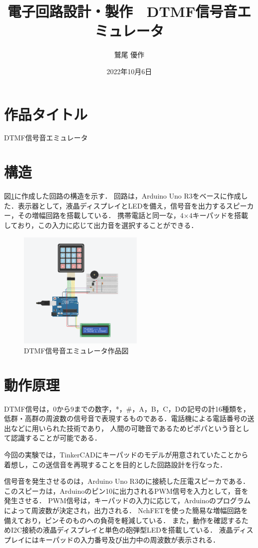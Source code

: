 \documentclass[dvipdfmx,titlepage,a4j]{jsarticle}  %
\title{電子回路設計・製作　DTMF信号音エミュレータ}
\author{鷲尾 優作}
\date{2022年10月6日}
\begin{document}
\pagestyle{foot}

\maketitle

\section{作品タイトル}
DTMF信号音エミュレータ
\section{構造}
図\ref{fig:dia.png}に作成した回路の構造を示す．
回路は，Arduino Uno R3をベースに作成した．表示器として，液晶ディスプレイとLEDを備え，信号音を出力するスピーカー，その増幅回路を搭載している．
携帯電話と同一な，4×4キーパッドを搭載しており，この入力に応じて出力音を選択することができる．

\begin{figure}[H]
  \centering
  \includegraphics[width=6cm]{../fig/dia.png}
  \caption{DTMF信号音エミュレータ作品図}
  \label{fig:dia.png}
\end{figure}

\section{動作原理}
DTMF信号は，0から9までの数字，*，\#，A，B，C，Dの記号の計16種類を，
低群・高群の周波数の信号音で表現するものである．電話機による電話番号の送出などに用いられた技術であり，
人間の可聴音であるためピポパという音として認識することが可能である．

今回の実験では，TinkerCADにキーパッドのモデルが用意されていたことから着想し，この送信音を再現することを目的とした回路設計を行なった．

信号音を発生させるのは，Arduino Uno R3のに接続した圧電スピーカである．
このスピーカは，Arduinoのピン10に出力されるPWM信号を入力として，音を発生させる．
PWM信号は，キーパッドの入力に応じて，Arduinoのプログラムによって周波数が決定され，出力される．
NchFETを使った簡易な増幅回路を備えており，ピンそのものへの負荷を軽減している．
また，動作を確認するためI2C接続の液晶ディスプレイと単色の砲弾型LEDを搭載している．
液晶ディスプレイにはキーパッドの入力番号及び出力中の周波数が表示される．
\end{document}
